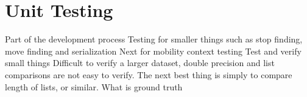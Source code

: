 \section{Unit Testing}
Part of the development process
Testing for smaller things such as stop finding, move finding and serialization
Next for mobility context testing
Test and verify small things
Difficult to verify a larger dataset, double precision and list comparisons are not easy to verify. The next best thing is simply to compare length of lists, or similar.
What is ground truth
